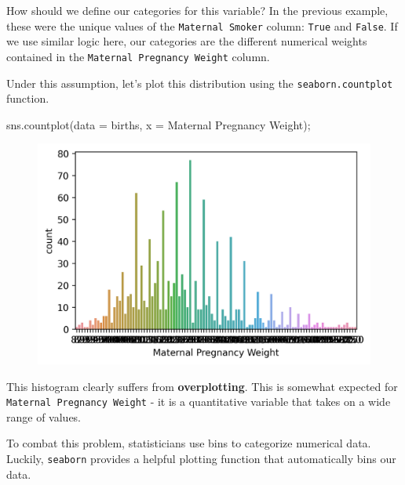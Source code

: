 \documentclass[
  letterpaper,
  DIV=11,
  numbers=noendperiod]{scrreprt}
\newenvironment{Shaded}{\begin{snugshade}}{\end{snugshade}}
\newcommand{\NormalTok}[1]{\textcolor[rgb]{0.00,0.23,0.31}{#1}}
\newcommand{\OperatorTok}[1]{\textcolor[rgb]{0.37,0.37,0.37}{#1}}
\newcommand{\StringTok}[1]{\textcolor[rgb]{0.13,0.47,0.30}{#1}}
\begin{document}
How should we define our categories for this variable? In the previous
example, these were the unique values of the \texttt{Maternal\ Smoker}
column: \texttt{True} and \texttt{False}. If we use similar logic here,
our categories are the different numerical weights contained in the
\texttt{Maternal\ Pregnancy\ Weight} column.

Under this assumption, let's plot this distribution using the
\texttt{seaborn.countplot} function.

\begin{Shaded}
\begin{Highlighting}[]
\NormalTok{sns.countplot(data }\OperatorTok{=}\NormalTok{ births, x }\OperatorTok{=} \StringTok{\textquotesingle{}Maternal Pregnancy Weight\textquotesingle{}}\NormalTok{)}\OperatorTok{;}
\end{Highlighting}
\end{Shaded}

\begin{figure}[H]

{\centering \includegraphics{visualization_1/visualization_1_files/figure-pdf/cell-7-output-1.png}

}

\end{figure}

This histogram clearly suffers from \textbf{overplotting}. This is
somewhat expected for \texttt{Maternal\ Pregnancy\ Weight} - it is a
quantitative variable that takes on a wide range of values.

To combat this problem, statisticians use bins to categorize numerical
data. Luckily, \texttt{seaborn} provides a helpful plotting function
that automatically bins our data.
\end{document}
